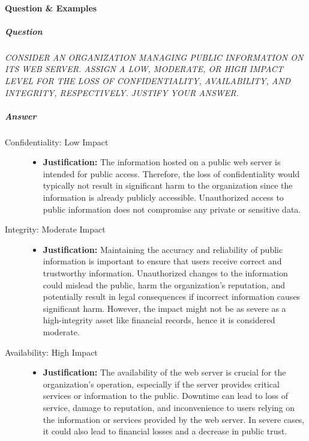 \documentclass{article}
\begin{document}
                    \paragraph{Question \& Examples}
                    \subparagraph{Question} \textit{CONSIDER AN ORGANIZATION MANAGING PUBLIC INFORMATION ON ITS
                    WEB SERVER.
                    ASSIGN A LOW, MODERATE, OR HIGH IMPACT LEVEL FOR THE LOSS OF
                    CONFIDENTIALITY, AVAILABILITY, AND INTEGRITY, RESPECTIVELY.
                    JUSTIFY YOUR ANSWER.}
                    \subparagraph{Answer}
                    \begin{description}
                         
                    
                    \item[Confidentiality: Low Impact]

                    \begin{itemize}
                        \item \textbf{Justification:} The information hosted on a public web server is intended for public access. Therefore, the loss of confidentiality would typically not result in significant harm to the organization since the information is already publicly accessible. Unauthorized access to public information does not compromise any private or sensitive data.
                    \end{itemize}

                  
                    \item[Integrity: Moderate Impact]

                    \begin{itemize}
                        \item \textbf{Justification:} Maintaining the accuracy and reliability of public information is important to ensure that users receive correct and trustworthy information. Unauthorized changes to the information could mislead the public, harm the organization's reputation, and potentially result in legal consequences if incorrect information causes significant harm. However, the impact might not be as severe as a high-integrity asset like financial records, hence it is considered moderate.
                    \end{itemize}
                    
                    \item[Availability: High Impact]

                    \begin{itemize}
                        \item \textbf{Justification:} The availability of the web server is crucial for the organization’s operation, especially if the server provides critical services or information to the public. Downtime can lead to loss of service, damage to reputation, and inconvenience to users relying on the information or services provided by the web server. In severe cases, it could also lead to financial losses and a decrease in public trust.
                    \end{itemize}

                    \end{description}
    \newpage
\end{document}
